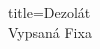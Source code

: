 \begin{song}{title=\predtitle\centering Dezolát\\\large Vypsaná Fixa \vspace*{-0.3cm}}
\begin{centerjustified}
\begin{varwidth}[t]{0.48\textwidth}
\end{varwidth}

\end{centerjustified}
\setcounter{Slokočet}{0}
\end{song}
